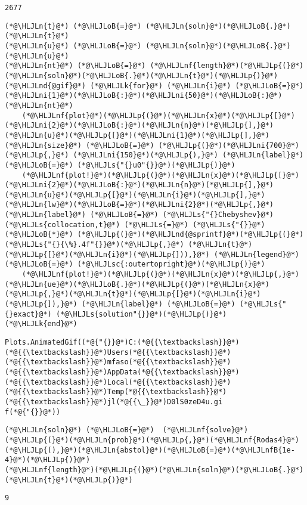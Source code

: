 \documentclass[12pt,landscape]{article}
\newcommand{\HLJLk}[1]{\textcolor[RGB]{148,91,176}{\textbf{#1}}}
\newcommand{\HLJLn}[1]{#1}
\newcommand{\HLJLnd}[1]{\textcolor[RGB]{214,102,97}{#1}}
\newcommand{\HLJLnf}[1]{\textcolor[RGB]{66,102,213}{#1}}
\newcommand{\HLJLs}[1]{\textcolor[RGB]{201,61,57}{#1}}
\newcommand{\HLJLsc}[1]{\textcolor[RGB]{201,61,57}{#1}}
\newcommand{\HLJLnfB}[1]{\textcolor[RGB]{59,151,46}{#1}}
\newcommand{\HLJLni}[1]{\textcolor[RGB]{59,151,46}{#1}}
\newcommand{\HLJLoB}[1]{\textcolor[RGB]{102,102,102}{\textbf{#1}}}
\newcommand{\HLJLp}[1]{#1}
\begin{document}
{\begin{lstlisting}
2677
\end{lstlisting}


\begin{lstlisting}
(*@\HLJLn{t}@*) (*@\HLJLoB{=}@*) (*@\HLJLn{soln}@*)(*@\HLJLoB{.}@*)(*@\HLJLn{t}@*)
(*@\HLJLn{u}@*) (*@\HLJLoB{=}@*) (*@\HLJLn{soln}@*)(*@\HLJLoB{.}@*)(*@\HLJLn{u}@*)
(*@\HLJLn{nt}@*) (*@\HLJLoB{=}@*) (*@\HLJLnf{length}@*)(*@\HLJLp{(}@*)(*@\HLJLn{soln}@*)(*@\HLJLoB{.}@*)(*@\HLJLn{t}@*)(*@\HLJLp{)}@*)
(*@\HLJLnd{@gif}@*) (*@\HLJLk{for}@*) (*@\HLJLn{i}@*) (*@\HLJLoB{=}@*) (*@\HLJLni{1}@*)(*@\HLJLoB{:}@*)(*@\HLJLni{50}@*)(*@\HLJLoB{:}@*)(*@\HLJLn{nt}@*) 
    (*@\HLJLnf{plot}@*)(*@\HLJLp{(}@*)(*@\HLJLn{x}@*)(*@\HLJLp{[}@*)(*@\HLJLni{2}@*)(*@\HLJLoB{:}@*)(*@\HLJLn{n}@*)(*@\HLJLp{],}@*) (*@\HLJLn{u}@*)(*@\HLJLp{[}@*)(*@\HLJLni{1}@*)(*@\HLJLp{],}@*) (*@\HLJLn{size}@*) (*@\HLJLoB{=}@*) (*@\HLJLp{(}@*)(*@\HLJLni{700}@*)(*@\HLJLp{,}@*) (*@\HLJLni{150}@*)(*@\HLJLp{),}@*) (*@\HLJLn{label}@*) (*@\HLJLoB{=}@*) (*@\HLJLs{"{}u0"{}}@*)(*@\HLJLp{)}@*)
    (*@\HLJLnf{plot!}@*)(*@\HLJLp{(}@*)(*@\HLJLn{x}@*)(*@\HLJLp{[}@*)(*@\HLJLni{2}@*)(*@\HLJLoB{:}@*)(*@\HLJLn{n}@*)(*@\HLJLp{],}@*) (*@\HLJLn{u}@*)(*@\HLJLp{[}@*)(*@\HLJLn{i}@*)(*@\HLJLp{],}@*) (*@\HLJLn{lw}@*)(*@\HLJLoB{=}@*)(*@\HLJLni{2}@*)(*@\HLJLp{,}@*) (*@\HLJLn{label}@*) (*@\HLJLoB{=}@*) (*@\HLJLs{"{}Chebyshev}@*) (*@\HLJLs{collocation,t}@*) (*@\HLJLs{=}@*) (*@\HLJLs{"{}}@*) (*@\HLJLoB{*}@*) (*@\HLJLp{(}@*)(*@\HLJLnd{@sprintf}@*)(*@\HLJLp{(}@*)(*@\HLJLs{"{}{\%}.4f"{}}@*)(*@\HLJLp{,}@*) (*@\HLJLn{t}@*)(*@\HLJLp{[}@*)(*@\HLJLn{i}@*)(*@\HLJLp{])),}@*) (*@\HLJLn{legend}@*) (*@\HLJLoB{=}@*) (*@\HLJLsc{:outertopright}@*)(*@\HLJLp{)}@*)
    (*@\HLJLnf{plot!}@*)(*@\HLJLp{(}@*)(*@\HLJLn{x}@*)(*@\HLJLp{,}@*) (*@\HLJLn{ue}@*)(*@\HLJLoB{.}@*)(*@\HLJLp{(}@*)(*@\HLJLn{x}@*)(*@\HLJLp{,}@*)(*@\HLJLn{t}@*)(*@\HLJLp{[}@*)(*@\HLJLn{i}@*)(*@\HLJLp{]),}@*) (*@\HLJLn{label}@*) (*@\HLJLoB{=}@*) (*@\HLJLs{"{}exact}@*) (*@\HLJLs{solution"{}}@*)(*@\HLJLp{)}@*)
(*@\HLJLk{end}@*)
\end{lstlisting}

\begin{lstlisting}
Plots.AnimatedGif((*@{"{}}@*)C:(*@{{\textbackslash}}@*)(*@{{\textbackslash}}@*)Users(*@{{\textbackslash}}@*)(*@{{\textbackslash}}@*)mfaso(*@{{\textbackslash}}@*)(*@{{\textbackslash}}@*)AppData(*@{{\textbackslash}}@*)(*@{{\textbackslash}}@*)Local(*@{{\textbackslash}}@*)(*@{{\textbackslash}}@*)Temp(*@{{\textbackslash}}@*)(*@{{\textbackslash}}@*)jl(*@{{\_}}@*)D0lS0zeD4u.gi
f(*@{"{}}@*))
\end{lstlisting}


\begin{lstlisting}
(*@\HLJLn{soln}@*) (*@\HLJLoB{=}@*)  (*@\HLJLnf{solve}@*)(*@\HLJLp{(}@*)(*@\HLJLn{prob}@*)(*@\HLJLp{,}@*)(*@\HLJLnf{Rodas4}@*)(*@\HLJLp{(),}@*)(*@\HLJLn{abstol}@*)(*@\HLJLoB{=}@*)(*@\HLJLnfB{1e-4}@*)(*@\HLJLp{)}@*)
(*@\HLJLnf{length}@*)(*@\HLJLp{(}@*)(*@\HLJLn{soln}@*)(*@\HLJLoB{.}@*)(*@\HLJLn{t}@*)(*@\HLJLp{)}@*)
\end{lstlisting}

\begin{lstlisting}
9
\end{lstlisting}


}
\end{document}
